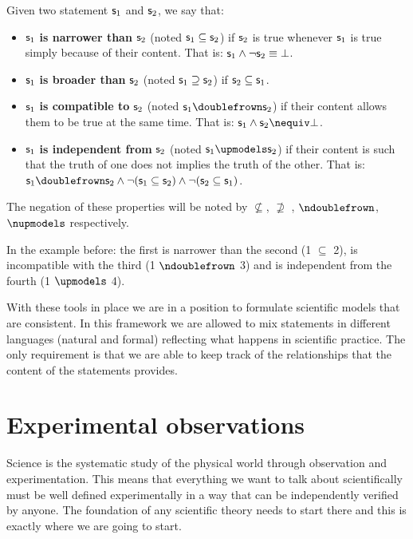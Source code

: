 \documentclass[11pt,letterpaper,fleqn]{memoir} %
\begin{document}
\begin{mathSection}

\begin{defn}
	Given two statement $\mathsf{s}_1$ and $\mathsf{s}_2$, we say that:
	\begin{itemize}
		\item $\mathsf{s}_1$ \textbf{is narrower than} $\mathsf{s}_2$ (noted $\mathsf{s}_1 \subseteq \mathsf{s}_2$) if $\mathsf{s}_2$ is true whenever $\mathsf{s}_1$ is true simply because of their content. That is: $\mathsf{s}_1 \wedge \neg \mathsf{s}_2 \equiv \bot$.
		\item $\mathsf{s}_1$ \textbf{is broader than} $\mathsf{s}_2$ (noted $\mathsf{s}_1 \supseteq \mathsf{s}_2$) if $\mathsf{s}_2 \subseteq \mathsf{s}_1$.
		\item $\mathsf{s}_1$ \textbf{is compatible to} $\mathsf{s}_2$ (noted $\astmt{s}_1 \comp \astmt{s}_2$) if their content allows them to be true at the same time. That is: $\astmt{s}_1 \wedge \astmt{s}_2 \nequiv \bot$.
		\item $\mathsf{s}_1$ \textbf{is independent from} $\mathsf{s}_2$ (noted $\astmt{s}_1 \indep \astmt{s}_2$) if their content is such that the truth of one does not implies the truth of the other. That is: $\astmt{s}_1 \comp \astmt{s}_2 \AND \NOT(\astmt{s}_1 \subseteq \astmt{s}_2) \AND \NOT(\astmt{s}_2 \subseteq \astmt{s}_1)$.
	\end{itemize}
	The negation of these properties will be noted by $\nsubseteq$, $\nsupseteq$ , $\ncomp$, $\nindep$ respectively.
\end{defn}

\end{mathSection}

In the example before: the first is narrower than the second (1 $\subseteq$ 2), is incompatible with the third (1 $\ncomp$ 3) and is independent from the fourth (1 $\indep$ 4).

With these tools in place we are in a position to formulate scientific models that are consistent. In this framework we are allowed to mix statements in different languages (natural and formal) reflecting what happens in scientific practice. The only requirement is that we are able to keep track of the relationships that the content of the statements provides.

\section{Experimental observations}

Science is the systematic study of the physical world through observation and experimentation. This means that everything we want to talk about scientifically must be well defined experimentally in a way that can be independently verified by anyone. The foundation of any scientific theory needs to start there and this is exactly where we are going to start.
\end{document}

